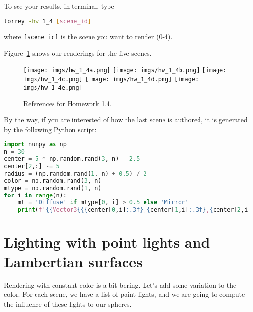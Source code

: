 To see your results, in terminal, type
\begin{lstlisting}[language=bash]
  torrey -hw 1_4 [scene_id]
\end{lstlisting}
where \lstinline{[scene_id]} is the scene you want to render (0-4).

Figure~\ref{fig:hw_1_4} shows our renderings for the five scenes.

\begin{figure}[ht]
    \centering
    \texttt{[image: imgs/hw\_1\_4a.png]}
    \texttt{[image: imgs/hw\_1\_4b.png]}
    \texttt{[image: imgs/hw\_1\_4c.png]}
    \texttt{[image: imgs/hw\_1\_4d.png]}
    \texttt{[image: imgs/hw\_1\_4e.png]}
    \caption{References for Homework 1.4.}
    \label{fig:hw_1_4}
\end{figure}

By the way, if you are interested of how the last scene is authored, it is generated by the following Python script:
\begin{lstlisting}[language=Python]
import numpy as np
n = 30
center = 5 * np.random.rand(3, n) - 2.5
center[2,:] -= 5
radius = (np.random.rand(1, n) + 0.5) / 2
color = np.random.rand(3, n)
mtype = np.random.rand(1, n)
for i in range(n):
    mt = 'Diffuse' if mtype[0, i] > 0.5 else 'Mirror'
    print(f'{{Vector3{{{center[0,i]:.3f},{center[1,i]:.3f},{center[2,i]:.3f}}}, {radius[0, i]:.3f}, Vector3{{{color[0,i]:.3f},{color[1,i]:.3f},{color[2,i]:.3f}}}, MaterialType::{mt}}},')
\end{lstlisting}

\section{Lighting with point lights and Lambertian surfaces}
Rendering with constant color is a bit boring. Let's add some variation to the color. For each scene, we have a list of point lights, and we are going to compute the influence of these lights to our spheres.

